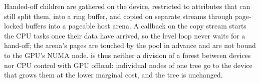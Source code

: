 Handed-off children are gathered on the device, restricted to attributes that can still split them, into a ring buffer, and copied on separate streams through page-locked buffers into a pageable host arena. A callback on the copy stream starts the CPU tasks once their data have arrived, so the level loop never waits for a hand-off; the arena's pages are touched by the pool in advance and are not bound to the GPU's NUMA node. \ImplHybrid{} is thus neither a division of a forest between devices nor CPU control with GPU offload: individual nodes of one tree go to the device that grows them at the lower marginal cost, and the tree is unchanged.
